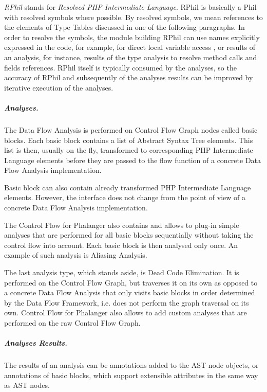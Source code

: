     \emph{RPhil} stands for \emph{Resolved PHP Intermediate Language}. 
    RPhil is basically a Phil with resolved symbols where possible. 
    By resolved symbols, we mean references to the elements 
    of Type Tables discussed in one of the following paragraphs. 
    In order to resolve the symbols, the module building RPhil 
    can use names explicitly expressed in the code, for example, 
    for direct local variable access , or results of 
    an analysis, for instance, results of the type analysis to 
    resolve method calls and fields references. 
    RPhil itself is typically consumed by the analyses, 
    so the accuracy of RPhil and subsequently of the 
    analyses results can be improved by iterative execution 
    of the analyses.
    
    \subparagraph*{Analyses.}
    The Data Flow Analysis is performed on Control Flow Graph 
    nodes called basic blocks. Each basic block contains 
    a list of Abstract Syntax Tree elements. This list is 
    then, usually on the fly, transformed to corresponding PHP 
    Intermediate Language elements before they are passed 
    to the flow function of a concrete Data Flow Analysis 
    implementation. 
    
    Basic block can also contain already transformed PHP 
    Intermediate Language elements. However, the interface 
    does not change from the point of view of a concrete 
    Data Flow Analysis implementation.
    
    The Control Flow for Phalanger also contains and allows to 
    plug-in simple analyses that are performed for all 
    basic blocks sequentially without taking the control 
    flow into account. Each basic block is then analysed 
    only once. An example of such analysis is Aliasing Analysis.
    
    The last analysis type, which stands aside, is Dead Code 
    Elimination. It is performed on the Control Flow Graph, 
    but traverses it on its own as opposed to a concrete 
    Data Flow Analysis that only visits basic blocks 
    in order determined by the Data Flow Framework, 
    i.e. does not perform the graph traversal 
    on its own. Control Flow for Phalanger also allows 
    to add custom analyses that are performed on the raw 
    Control Flow Graph.
    
    \subparagraph*{Analyses Results.}
    The results of an analysis can be annotations added 
    to the AST node objects, or annotations of basic blocks, 
    which support extensible attributes in the same way as 
    AST nodes.
    
